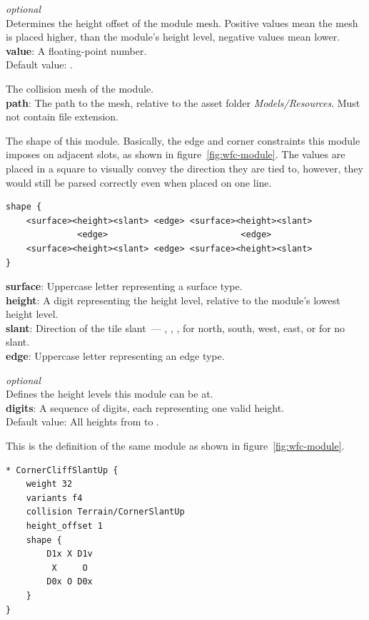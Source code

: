 \emph{optional}\\
Determines the height offset of the module mesh.
Positive values mean the mesh is placed higher, than the module's height level, negative values mean lower.\\
\textbf{value}: A floating-point number.\\
Default value: .

The collision mesh of the module.\\
\textbf{path}: The path to the mesh, relative to the asset folder \emph{Models/Resources}. Must not contain file extension.

The shape of this module.
Basically, the edge and corner constraints this module imposes on adjacent slots, as shown in figure~\ref{fig:wfc-module}.
The values are placed in a square to visually convey the direction they are tied to, however, they would still be parsed correctly even when placed on one line.
\begin{verbatim}
shape {
    <surface><height><slant> <edge> <surface><height><slant>
              <edge>                          <edge>
    <surface><height><slant> <edge> <surface><height><slant>
}
\end{verbatim}
\textbf{surface}: Uppercase letter representing a surface type.\\
\textbf{height}: A digit representing the height level, relative to the module's lowest height level.\\
\textbf{slant}: Direction of the tile slant~--- \mono{\^}, , \mono{<}, \mono{>} for north, south, west, east, or  for no slant.\\
\textbf{edge}: Uppercase letter representing an edge type.

\emph{optional}\\
Defines the height levels this module can be at.\\
\textbf{digits}: A sequence of digits, each representing one valid height.\\
Default value: All heights from  to .

This is the definition of the same module as shown in figure~\ref{fig:wfc-module}.
\begin{verbatim}
* CornerCliffSlantUp {
    weight 32
    variants f4
    collision Terrain/CornerSlantUp
    height_offset 1
    shape {
        D1x X D1v
         X     O
        D0x O D0x
    }
}
\end{verbatim}